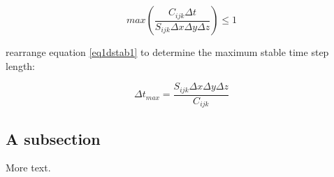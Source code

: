 \documentclass[11pt]{article} %
\begin{document}
\begin{equation} \label{eq1dstab1}
max \left( \frac{C_{ijk} \Delta t}{S_{ijk} \Delta x \Delta y \Delta z} \right) \le 1 
\end{equation}

\noindent rearrange equation \ref{eq1dstab1} to determine the maximum stable time step length:

\begin{equation} \label{eq1dstab2}
\Delta t_{max} = \frac{S_{ijk} \Delta x \Delta y \Delta z}{C_{ijk} } 
\end{equation}

\subsection{A subsection}

More text.
\end{document}
